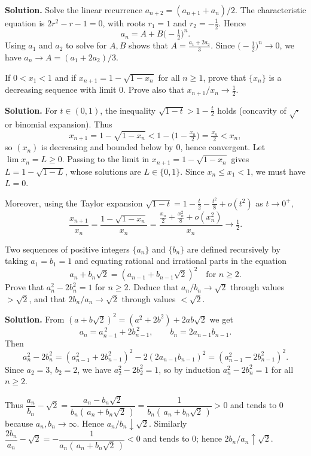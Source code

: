 \noindent\textbf{Solution.}
Solve the linear recurrence $a_{n+2}=(a_{n+1}+a_n)/2$. The characteristic equation is $2r^2-r-1=0$, with roots $r_1=1$ and $r_2=-\tfrac12$. Hence
\[
a_n=A+B\Big(-\tfrac12\Big)^{\!n}.
\]
Using $a_1$ and $a_2$ to solve for $A,B$ shows that $A=\displaystyle\frac{a_1+2a_2}{3}$. Since $\big(-\tfrac12\big)^n\to 0$, we have $a_n\to A=(a_1+2a_2)/3$.
\medskip

\begin{problembox}
If $0 < x_1 < 1$ and if $x_{n+1} = 1 - \sqrt{1 - x_n}$ for all $n \geq 1$, prove that $\{x_n\}$ is a decreasing sequence with limit 0. Prove also that $x_{n+1}/x_n \to \frac{1}{2}$.
\end{problembox}

\noindent\textbf{Solution.}
For $t\in(0,1)$, the inequality $\sqrt{1-t}>1-\tfrac{t}{2}$ holds (concavity of $\sqrt{\cdot}$ or binomial expansion). Thus
\[
x_{n+1}=1-\sqrt{1-x_n}<1-\Big(1-\tfrac{x_n}{2}\Big)=\tfrac{x_n}{2}<x_n,
\]
so $(x_n)$ is decreasing and bounded below by $0$, hence convergent. Let $\lim x_n=L\ge 0$. Passing to the limit in $x_{n+1}=1-\sqrt{1-x_n}$ gives $L=1-\sqrt{1-L}$, whose solutions are $L\in\{0,1\}$. Since $x_n\le x_1<1$, we must have $L=0$.

Moreover, using the Taylor expansion $\sqrt{1-t}=1-\tfrac{t}{2}-\tfrac{t^2}{8}+o(t^2)$ as $t\to 0^+$,
\[
\frac{x_{n+1}}{x_n}=\frac{1-\sqrt{1-x_n}}{x_n}=\frac{\tfrac{x_n}{2}+\tfrac{x_n^2}{8}+o(x_n^2)}{x_n}\to \tfrac12.
\]
\medskip

\begin{problembox}
Two sequences of positive integers $\{a_n\}$ and $\{b_n\}$ are defined recursively by taking $a_1 = b_1 = 1$ and equating rational and irrational parts in the equation
\[a_n + b_n \sqrt{2} = (a_{n-1} + b_{n-1} \sqrt{2})^2 \quad \text{for } n \geq 2.\]
Prove that $a_n^2 - 2b_n^2 = 1$ for $n \geq 2$. Deduce that $a_n/b_n \to \sqrt{2}$ through values $> \sqrt{2}$, and that $2b_n/a_n \to \sqrt{2}$ through values $< \sqrt{2}$.
\end{problembox}

\noindent\textbf{Solution.}
From $(a+b\sqrt2)^2=(a^2+2b^2)+2ab\sqrt2$ we get
\[
a_n=a_{n-1}^{\,2}+2b_{n-1}^{\,2},\qquad b_n=2a_{n-1}b_{n-1}.
\]
Then
\[
a_n^2-2b_n^2=(a_{n-1}^2+2b_{n-1}^2)^2-2(2a_{n-1}b_{n-1})^2=(a_{n-1}^2-2b_{n-1}^2)^2.
\]
Since $a_2=3$, $b_2=2$, we have $a_2^2-2b_2^2=1$, so by induction $a_n^2-2b_n^2=1$ for all $n\ge 2$.

Thus $\dfrac{a_n}{b_n}-\sqrt2=\dfrac{a_n-b_n\sqrt2}{b_n(\,a_n+b_n\sqrt2\,)}=\dfrac{1}{b_n(\,a_n+b_n\sqrt2\,)}>0$ and tends to $0$ because $a_n,b_n\to\infty$. Hence $a_n/b_n\downarrow\sqrt2$. Similarly $\dfrac{2b_n}{a_n}-\sqrt2=-\dfrac{1}{a_n(\,a_n+b_n\sqrt2\,)}<0$ and tends to $0$; hence $2b_n/a_n\uparrow\sqrt2$.
\medskip


